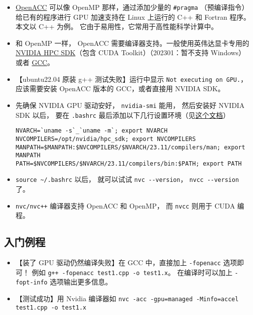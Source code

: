 

\begin{itemize}
\item \href{https://www.openacc.org/}{OpenACC} 可以像 OpenMP 那样，通过添加少量的 \verb`#pragma` （预编译指令）给已有的程序进行 GPU 加速支持在 Linux 上运行的 C++ 和 Fortran 程序。本文以 C++ 为例。 它由于易用性，它常用于高性能科学计算中。
\item 和 OpenMP 一样， OpenACC 需要编译器支持。一般使用英伟达显卡专用的 \href{https://developer.nvidia.com/hpc-sdk}{NVIDIA HPC SDK}（包含 CUDA Toolkit）（202301：暂不支持 Windows） 或者 \href{https://www.openacc.org/tools/gcc-for-openacc}{GCC}。
\item 【ubuntu22.04 原装 g++ 测试失败】运行中显示 \verb`Not executing on GPU.`，应该需要安装 OpenACC 版本的 GCC，或者直接用 NVIDIA SDK。
\item 先确保 NVIDIA GPU 驱动安好， \verb`nvidia-smi` 能用， 然后安装好 NVIDIA SDK 以后， 要在 \verb`.bashrc` 最后添加以下几行设置环境（见\href{https://docs.nvidia.com/hpc-sdk//hpc-sdk-install-guide/index.html}{这个文档}）
\begin{lstlisting}[language=none]
NVARCH=`uname -s`_`uname -m`; export NVARCH
NVCOMPILERS=/opt/nvidia/hpc_sdk; export NVCOMPILERS
MANPATH=$MANPATH:$NVCOMPILERS/$NVARCH/23.11/compilers/man; export MANPATH
PATH=$NVCOMPILERS/$NVARCH/23.11/compilers/bin:$PATH; export PATH
\end{lstlisting}
\item \verb`source ~/.bashrc` 以后， 就可以试试 \verb`nvc --version`， \verb`nvcc --version` 了。
\item \verb`nvc/nvc++` 编译器支持 OpenACC 和 OpenMP， 而 \verb`nvcc` 则用于 CUDA 编程。
\end{itemize}

\subsection{入门例程}
\begin{itemize}
\item 【装了 GPU 驱动仍然编译失败】在 GCC 中，直接加上 \verb`-fopenacc` 选项即可！ 例如 \verb`g++ -fopenacc test1.cpp -o test1.x`。 在编译时可以加上 \verb`-fopt-info` 选项输出更多信息。
\item 【测试成功】用 Nvidia 编译器如 \verb`nvc -acc -gpu=managed -Minfo=accel test1.cpp -o test1.x`
\end{itemize}

